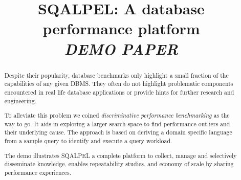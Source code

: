 \documentclass{cidr-2019}
\begin{document}
\title{SQALPEL: A database performance platform\\\emph{DEMO PAPER}}
\author{
}

\maketitle
\date{}

\begin{abstract}
Despite their popularity, database benchmarks only highlight a
small fraction of the capabilities of any given DBMS. They often do not
highlight problematic components encountered in real life database applications
or provide hints for further research and engineering. 



To alleviate this problem we coined  \textit{discriminative performance benchmarking}
as the way to go. It aids in exploring a larger search space to find performance outliers and their underlying cause.  The approach is based on deriving a domain specific
language from a sample query to identify and execute a query workload.  

The demo illustrates {\sc SQALPEL} a complete platform to collect, manage and selectively
disseminate knowledge, enables repeatability studies, and 
economy of scale by sharing performance experiences.

\end{abstract}
\end{document}
